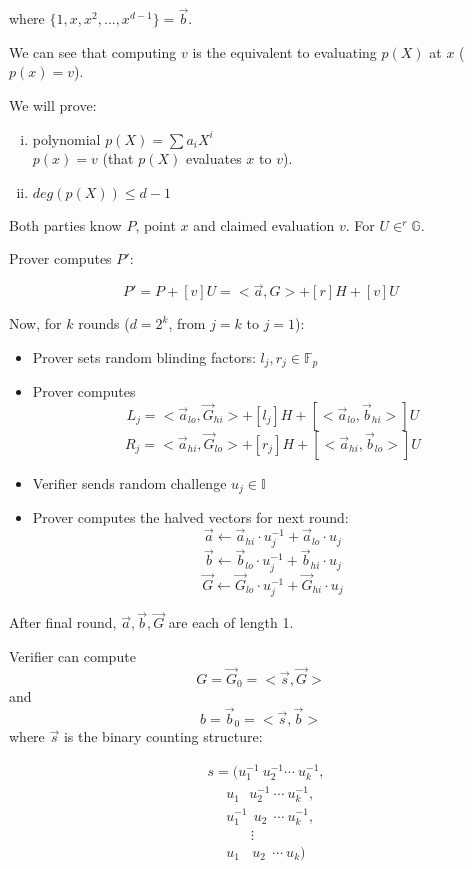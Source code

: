 \documentclass{article}
\theoremstyle{definition}
\begin{document}
where $\{1, x, x^2, \ldots, x^{d-1} \} = \overrightarrow{b}$.

We can see that computing $v$ is the equivalent to evaluating $p(X)$ at $x$ ($p(x)=v$).

We will prove:
\begin{enumerate}[i.]
    \item polynomial $p(X) = \sum a_i X^i$\\
	$p(x) = v$ (that $p(X)$ evaluates $x$ to $v$).
    \item $deg(p(X)) \leq d-1$
\end{enumerate}


Both parties know $P$, point $x$ and claimed evaluation $v$. For $U \in^r \mathbb{G}$.

Prover computes $P'$:

$$P' = P + [v] U = <\overrightarrow{a}, G> + [r]H + [v] U$$

Now, for $k$ rounds ($d=2^k$, from $j=k$ to $j=1$):
\begin{itemize}
    \item Prover sets random blinding factors: $l_j, r_j \in \mathbb{F}_p$
    \item Prover computes
	$$L_j = < \overrightarrow{a}_{lo}, \overrightarrow{G}_{hi}> + [l_j] H + [< \overrightarrow{a}_{lo}, \overrightarrow{b}_{hi}>] U$$
	$$R_j = < \overrightarrow{a}_{hi}, \overrightarrow{G}_{lo}> + [r_j] H + [< \overrightarrow{a}_{hi}, \overrightarrow{b}_{lo}>] U$$
    \item Verifier sends random challenge $u_j \in \mathbb{I}$
    \item Prover computes the halved vectors for next round:
	$$\overrightarrow{a} \leftarrow \overrightarrow{a}_{hi} \cdot u_j^{-1} + \overrightarrow{a}_{lo} \cdot u_j$$
	$$\overrightarrow{b} \leftarrow \overrightarrow{b}_{lo} \cdot u_j^{-1} + \overrightarrow{b}_{hi} \cdot u_j$$
	$$\overrightarrow{G} \leftarrow \overrightarrow{G}_{lo} \cdot u_j^{-1} + \overrightarrow{G}_{hi} \cdot u_j$$
\end{itemize}

After final round, $\overrightarrow{a}, \overrightarrow{b}, \overrightarrow{G}$ are each of length 1.

Verifier can compute
$$G = \overrightarrow{G}_0 = < \overrightarrow{s}, \overrightarrow{G} >$$
and $$b = \overrightarrow{b}_0 = < \overrightarrow{s}, \overrightarrow{b} >$$
where $\overrightarrow{s}$ is the binary counting structure:

\begin{align*}
    &s = (u_1^{-1} ~ u_2^{-1} \cdots ~u_k^{-1},\\
    &~~~~~~u_1 ~~~ u_2^{-1} ~\cdots ~u_k^{-1},\\
    &~~~~~~u_1^{-1} ~~ u_2 ~~\cdots ~u_k^{-1},\\
    &~~~~~~~~~~~~~~\vdots\\
    &~~~~~~u_1 ~~~~ u_2 ~~\cdots ~u_k)
\end{align*}
\end{document}
